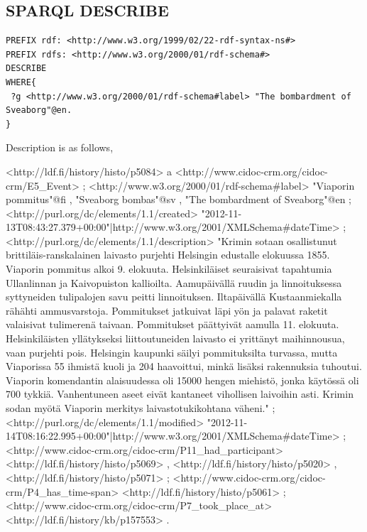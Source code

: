 \documentclass{article}
\begin{document}
$ $

$ $

$ $

$ $

$ $
\subsection{SPARQL DESCRIBE}

\begin{verbatim}
PREFIX rdf: <http://www.w3.org/1999/02/22-rdf-syntax-ns#>
PREFIX rdfs: <http://www.w3.org/2000/01/rdf-schema#>
DESCRIBE
WHERE{
 ?g <http://www.w3.org/2000/01/rdf-schema#label> "The bombardment of Sveaborg"@en.
}
\end{verbatim}

Description is as follows,

\begin{spverbatim}
<http://ldf.fi/history/histo/p5084>
        a       <http://www.cidoc-crm.org/cidoc-crm/E5_Event> ;
        <http://www.w3.org/2000/01/rdf-schema#label>
                "Viaporin pommitus"@fi , "Sveaborg bombas"@sv , "The bombardment of Sveaborg"@en ;
        <http://purl.org/dc/elements/1.1/created>
                "2012-11-13T08:43:27.379+00:00"^^<http://www.w3.org/2001/XMLSchema#dateTime> ;
        <http://purl.org/dc/elements/1.1/description>
                "Krimin sotaan osallistunut brittiläis-ranskalainen laivasto purjehti Helsingin edustalle elokuussa 1855. Viaporin pommitus alkoi 9. elokuuta. Helsinkiläiset seuraisivat tapahtumia Ullanlinnan ja Kaivopuiston kallioilta. Aamupäivällä ruudin ja linnoituksessa syttyneiden tulipalojen savu peitti linnoituksen. Iltapäivällä Kustaanmiekalla rähähti ammusvarstoja. Pommitukset jatkuivat läpi yön ja palavat raketit valaisivat tulimerenä taivaan. Pommitukset päättyivät aamulla 11. elokuuta. Helsinkiläisten yllätykseksi liittoutuneiden laivasto ei yrittänyt maihinnousua, vaan purjehti pois. Helsingin kaupunki säilyi pommituksilta turvassa, mutta Viaporissa 55 ihmistä kuoli ja 204 haavoittui, minkä lisäksi rakennuksia tuhoutui. Viaporin komendantin alaisuudessa oli 15000 hengen miehistö, jonka käytössä oli 700 tykkiä. Vanhentuneen aseet eivät kantaneet vihollisen laivoihin asti. Krimin sodan myötä Viaporin merkitys laivastotukikohtana väheni." ;
        <http://purl.org/dc/elements/1.1/modified>
                "2012-11-14T08:16:22.995+00:00"^^<http://www.w3.org/2001/XMLSchema#dateTime> ;
        <http://www.cidoc-crm.org/cidoc-crm/P11_had_participant>
                <http://ldf.fi/history/histo/p5069> , <http://ldf.fi/history/histo/p5020> , <http://ldf.fi/history/histo/p5071> ;
        <http://www.cidoc-crm.org/cidoc-crm/P4_has_time-span>
                <http://ldf.fi/history/histo/p5061> ;
        <http://www.cidoc-crm.org/cidoc-crm/P7_took_place_at>
                <http://ldf.fi/history/kb/p157553> .
\end{spverbatim}
$ $
\end{document}
